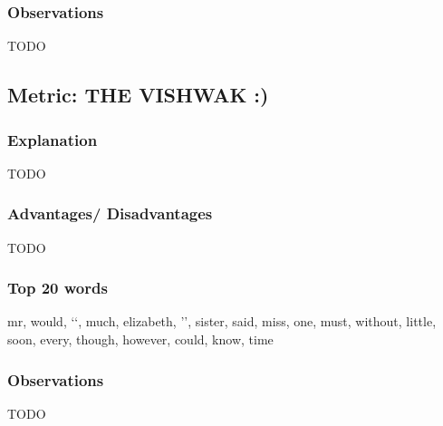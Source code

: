 \documentclass{article}
\begin{document}
\subsubsection{Observations}
TODO

\newpage
\subsection{Metric: THE VISHWAK :) }
\subsubsection{Explanation}
TODO
\subsubsection{Advantages/ Disadvantages}
TODO
\subsubsection{Top 20 words}
\begin{flushleft}
    mr, would, \lq\lq, much, elizabeth, \rq\rq, sister, said, miss, one, must, without, little, soon, every, though, however, could, know, time
\end{flushleft}
\subsubsection{Observations}
TODO
\end{document}
